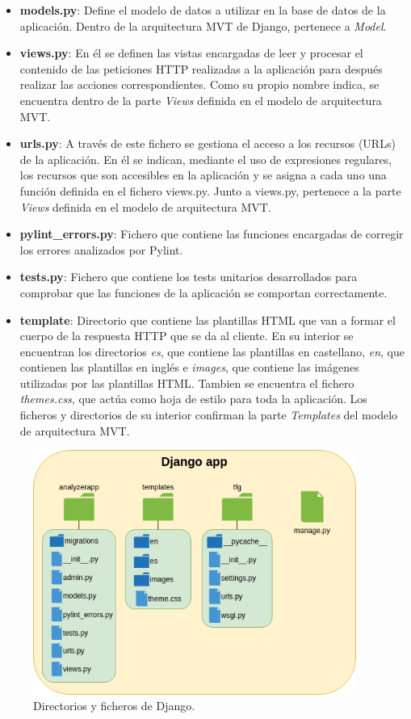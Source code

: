 \documentclass[a4paper, 12pt]{book}
\begin{document}
\begin{itemize}
	\item \textbf{models.py}: Define el modelo de datos a utilizar en la base de datos de la aplicación. Dentro de la arquitectura MVT de Django, pertenece a \textit{Model}.
	\item \textbf{views.py}: En él se definen las vistas encargadas de leer y procesar el contenido de las peticiones HTTP realizadas a la aplicación para después realizar las acciones correspondientes.
	Como su propio nombre indica, se encuentra dentro de la parte \textit{Views} definida en el modelo de arquitectura MVT.
	\item \textbf{urls.py}: A través de este fichero se gestiona el acceso a los recursos (URLs) de la aplicación.
	En él se indican, mediante el uso de expresiones regulares, los recursos que son accesibles en la aplicación y se asigna a cada uno una función definida en el fichero views.py. Junto a views.py, pertenece a la parte \textit{Views} definida en el modelo de arquitectura MVT.
	\item \textbf{pylint\_errors.py}: Fichero que contiene las funciones encargadas de corregir los errores analizados por Pylint.
	\item \textbf{tests.py}: Fichero que contiene los tests unitarios desarrollados para comprobar que las funciones de la aplicación se comportan correctamente.
	\item \textbf{template}: Directorio que contiene las plantillas HTML que van a formar el cuerpo de la respuesta HTTP que se da al cliente. En su interior se encuentran los directorios \textit{es}, que contiene las plantillas en castellano, \textit{en}, que contienen las plantillas en inglés e \textit{images}, que contiene las imágenes utilizadas por las plantillas HTML. Tambien se encuentra el fichero \textit{themes.css}, que actúa como hoja de estilo para toda la aplicación. Los ficheros y directorios de su interior confirman la parte \textit{Templates} del modelo de arquitectura MVT.
\end{itemize}

\begin{figure}
  \centering
  \includegraphics[height=8cm, keepaspectratio]{img/directorios.png}
  \caption{Directorios y ficheros de Django.}\label{fig:directorios}
\end{figure}
\end{document}
